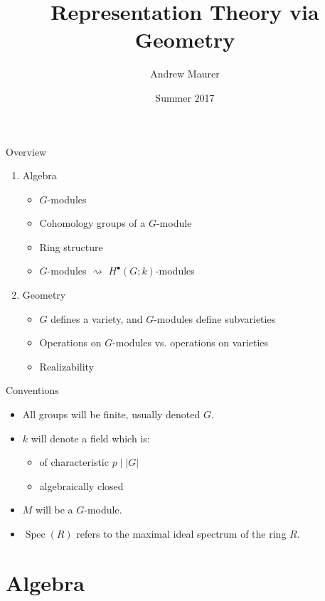 \documentclass{beamer}
\theoremstyle{definition}
\newcommand{\spec}{\operatorname{Spec}}
\begin{document}
\title{Representation Theory via Geometry}
\author{Andrew Maurer}
\date{Summer 2017}

\frame{\titlepage}

\begin{frame}{Overview}
  \pause
  \begin{enumerate}
  \item Algebra \pause
    \begin{itemize}
    \item $G$-modules \pause
    \item Cohomology groups of a $G$-module \pause
    \item Ring structure\pause
    \item $G$-modules $\rightsquigarrow$ $H^\bullet(G;k)$-modules \pause
    \end{itemize}
  \item Geometry
    \begin{itemize}
    \item $G$ defines a variety, and $G$-modules define subvarieties \pause
    \item Operations on $G$-modules vs. operations on varieties \pause
    \item Realizability 
    \end{itemize}
  \end{enumerate}
\end{frame}

\begin{frame}{Conventions}
  \pause
  \begin{itemize}
  \item All groups will be finite, usually denoted $G$.\pause
  \item $k$ will denote a field which is:\pause
    \begin{itemize}
    \item of characteristic $p \mid |G|$\pause
    \item algebraically closed\pause
    \end{itemize}
  \item $M$ will be a $G$-module.\pause
  \item $\spec(R)$ refers to the maximal ideal spectrum of the ring $R$.\pause
  \end{itemize}
\end{frame}

\section{Algebra}
\end{document}
